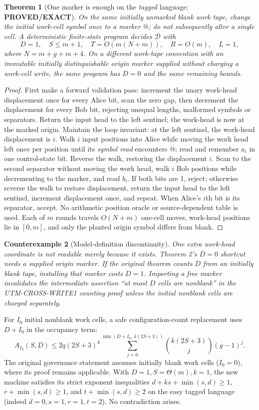 \documentclass[11pt]{article}
\newtheorem{theorem}{Theorem}
\newtheorem{counterexample}[theorem]{Counterexample}
\begin{document}
\begin{theorem}[One marker is enough on the \emph{tagged} language; \textbf{PROVED/EXACT}]
On the same initially unmarked blank work tape, change the initial work-cell symbol once to a marker $\mathtt{@}$; do not subsequently alter a single cell. A deterministic finite-state program decides \(\mathcal D\) with
\[
   D=1,\quad S\le m+1,\quad T=O(m(N+m)),\quad R=O(m),\quad L=1,     \tag{6}
\]
where $N=m+g+m+4$. On a \emph{different} work-tape convention with an immutable initially distinguishable origin marker supplied without charging a work-cell write, the same program has $D=0$ and the same remaining bounds.
\end{theorem}
\begin{proof}First make a forward validation pass: increment the unary work-head displacement once for every Alice bit, scan the zero gap, then decrement the displacement for every Bob bit, rejecting unequal lengths, malformed symbols or separators. Return the input head to the left sentinel; the work-head is now at the marked origin. Maintain the loop invariant: at the left sentinel, the work-head displacement is $i$. Walk $i$ input positions into Alice while moving the work head left once per position until its \emph{symbol read} encounters $\mathtt{@}$; read and remember $a_i$ in one control-state bit. Reverse the walk, restoring the displacement $i$. Scan to the second separator without moving the work head, walk $i$ Bob positions while decrementing to the marker, and read $b_i$. If both bits are 1, reject; otherwise reverse the walk to restore displacement, return the input head to the left sentinel, increment displacement once, and repeat. When Alice's $i$th bit is its separator, accept. No arithmetic position oracle or source-dependent table is used. Each of $m$ rounds travels $O(N+m)$ one-cell moves, work-head positions lie in $[0,m]$, and only the planted origin symbol differs from blank.\end{proof}

\begin{counterexample}[Model-definition discontinuity]
One extra work-head coordinate is \emph{not readable} merely because it exists. Theorem 2's $D=0$ shortcut needs a supplied origin marker. If the original theorem counts $D$ from an \emph{initially blank} tape, installing that marker costs $D=1$. Importing a free marker invalidates the intermediate assertion ``at most $D$ cells are nonblank'' in the UTM-CROSS-WRITE1 counting proof unless the initial nonblank cells are charged separately.
\end{counterexample}
For $I_0$ initial nonblank work cells, a safe configuration-count replacement uses $D+I_0$ in the occupancy term:
\[
  A_{I_0}(S,D)\le 2q(2S+3)^k
  \sum_{j=0}^{\min(D+I_0,\,k(2S+3))}
  {k(2S+3)\choose j}(g-1)^j.                            \tag{7}
\]
The original governance statement assumes initially blank work cells ($I_0=0$), where its proof remains applicable. With $D=1,S=\Theta(m),k=1$, the new machine satisfies its strict exponent inequalities $d+ks+\min(s,d)\ge1$, $r+\min(s,d)\ge1$, and $t+\min(s,d)\ge2$ on the easy tagged language (indeed $d=0,s=1,r=1,t=2$). No contradiction arises.
\end{document}
